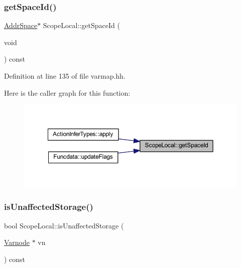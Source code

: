 \subsubsection{\texorpdfstring{getSpaceId()}{getSpaceId()}}
{\footnotesize\ttfamily \mbox{\hyperlink{class_addr_space}{Addr\+Space}}$\ast$ Scope\+Local\+::get\+Space\+Id (\begin{DoxyParamCaption}\item[{void}]{ }\end{DoxyParamCaption}) const\hspace{0.3cm}{\ttfamily [inline]}}



Definition at line 135 of file varmap.\+hh.

Here is the caller graph for this function\+:
\nopagebreak
\begin{figure}[H]
\begin{center}
\leavevmode
\includegraphics[width=350pt]{class_scope_local_ab1de60987435b80d4a82c5967b163557_icgraph}
\end{center}
\end{figure}
\mbox{\label{class_scope_local_ac6913e22130acb08f7d075a136c36780}} 
\subsubsection{\texorpdfstring{isUnaffectedStorage()}{isUnaffectedStorage()}}
{\footnotesize\ttfamily bool Scope\+Local\+::is\+Unaffected\+Storage (\begin{DoxyParamCaption}\item[{\mbox{\hyperlink{class_varnode}{Varnode}} $\ast$}]{vn }\end{DoxyParamCaption}) const\hspace{0.3cm}{\ttfamily [inline]}}



